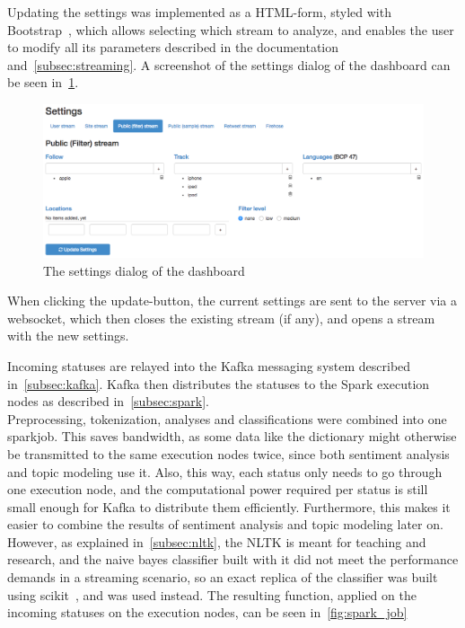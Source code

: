 Updating the settings was implemented as a HTML-form, styled with Bootstrap~\cite{bootstrapDocs},
which allows selecting which stream to analyze, and enables the user to modify all its parameters
described in the documentation~\cite{twitterDocs} and~\ref{subsec:streaming}.
A screenshot of the settings dialog of the dashboard can be seen in~\ref{fig:dashboard-settings}.

\begin{figure}
    \centering
    \caption{The settings dialog of the dashboard}
    \label{fig:dashboard-settings}
    \includegraphics[width=\textwidth]{../images/dashboard_settings.png}
\end{figure}

When clicking the update-button, the current settings are sent to the server via a websocket,
which then closes the existing stream (if any), and opens a stream with the new settings.
\par
Incoming statuses are relayed into the Kafka messaging system described in~\ref{subsec:kafka}.
Kafka then distributes the statuses to the Spark execution nodes as described in~\ref{subsec:spark}.
\\
Preprocessing, tokenization, analyses and classifications were combined into one sparkjob.
This saves bandwidth, as some data like the dictionary might otherwise be transmitted to the same execution nodes twice,
since both sentiment analysis and topic modeling use it.
Also, this way, each status only needs to go through one execution node,
and the computational power required per status is still small enough for Kafka to distribute them efficiently.
Furthermore, this makes it easier to combine the results of sentiment analysis and topic modeling later on.
However, as explained in~\ref{subsec:nltk}, the NLTK is meant for teaching and research,
and the naive bayes classifier built with it did not meet the performance demands in a streaming scenario,
so an exact replica of the classifier was built using scikit~\cite{scikitDocs}, and was used instead.
The resulting function, applied on the incoming statuses on the execution nodes, can be seen in~\ref{fig:spark_job}

